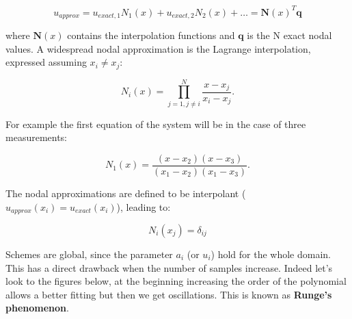 	\begin{equation}
	u_{approx} = u_{exact,1}N_1(x) + u_{exact,2}N_2(x) + \dots = \bm{N}(x)^T\bm{q}
	\end{equation}
	
	where $\bm{N}(x)$ contains the interpolation functions and $\bm{q}$ is the N exact nodal values. A widespread nodal approximation is the Lagrange interpolation, expressed assuming $x_i \neq x_j$: 
	
	\begin{equation}
	N_i (x) = \prod ^N _{j=1, j \neq i} \frac{x-x_j}{x_i-x_j}. 
	\label{eq:5.5}
	\end{equation}
	
	For example the first equation of the system will be in the case of three measurements: 
	
	\begin{equation}
	N_1(x) = \frac{(x-x_2)(x-x_3)}{(x_1-x_2)(x_1-x_3)}.
	\end{equation}
	
	The nodal approximations are defined to be interpolant ($u_{approx}(x_i) = u_{exact}(x_i)$), leading to:
	
	\begin{equation}
	N_i(x_j) = \delta _{ij}
	\end{equation}
	
	Schemes are global, since the parameter $a_i$ (or $u_i$) hold for the whole domain. This has a direct drawback when the number of samples increase. Indeed let's look to the figures below, at the beginning increasing the order of the polynomial allows a better fitting but then we get oscillations. This is known as \textbf{Runge's phenomenon}. 
	
